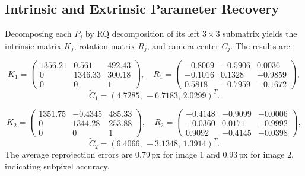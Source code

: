 \subsection{Intrinsic and Extrinsic Parameter Recovery}
Decomposing each $P_j$ by RQ decomposition of its left $3\times3$ submatrix yields the intrinsic matrix $K_j$, rotation matrix $R_j$, and camera center $\tilde C_j$. The results are:

\[
K_1 = \begin{pmatrix}
1356.21 & 0.561 & 492.43 \\
0 & 1346.33 & 300.18 \\
0 & 0 & 1
\end{pmatrix},
\quad
R_1 = \begin{pmatrix}
-0.8069 & -0.5906 & 0.0036 \\
-0.1016 & 0.1328 & -0.9859 \\
 0.5818 & -0.7959 & -0.1672
\end{pmatrix},
\]
\[
\tilde C_1 = (4.7285,\,-6.7183,\,2.0299)^T.
\]

\[
K_2 = \begin{pmatrix}
1351.75 & -0.4345 & 485.33 \\
0 & 1344.28 & 253.88 \\
0 & 0 & 1
\end{pmatrix},
\quad
R_2 = \begin{pmatrix}
-0.4148 & -0.9099 & -0.0006 \\
-0.0360 & 0.0171 & -0.9992 \\
 0.9092 & -0.4145 & -0.0398
\end{pmatrix},
\]
\[
\tilde C_2 = (6.4066,\,-3.1348,\,1.3914)^T.
\]
The average reprojection errors are 0.79\,px for image 1 and 0.93\,px for image 2, indicating subpixel accuracy.